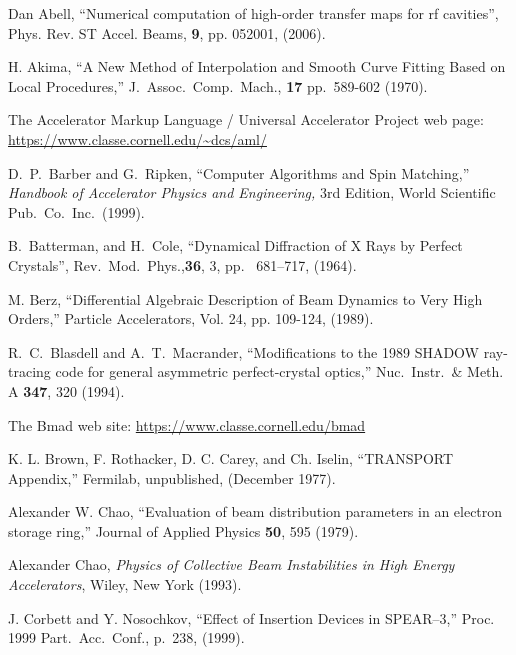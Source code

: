 \begin{thebibliography}{XXXXXXX99}

Dan Abell, ``Numerical computation of high-order transfer maps for rf cavities'',
Phys. Rev. ST Accel. Beams, {\bf 9}, pp. 052001, (2006).

H. Akima, ``A New Method of Interpolation and Smooth Curve Fitting Based on
Local Procedures,'' J.\ Assoc.\ Comp.\ Mach., {\bf 17} pp.~589-602 (1970).

The Accelerator Markup Language / Universal Accelerator Project web page:
\hfill\break
\hspace*{0.3in}
\url{https://www.classe.cornell.edu/~dcs/aml/}

D.~P.~Barber and G.~Ripken,
``Computer Algorithms and Spin Matching,''
{\it Handbook of Accelerator Physics and Engineering,}
3rd Edition, World Scientific Pub.\ Co.\ Inc.\ (1999).

B.~Batterman, and H.~Cole,
``Dynamical Diffraction of X Rays by Perfect Crystals'',
Rev.\ Mod.\ Phys.,{\bf 36}, 3, pp.~ 681--717, (1964).

M. Berz, 
``Differential Algebraic Description of Beam Dynamics to Very High Orders,''
Particle Accelerators, Vol. 24, pp. 109-124, (1989).

R.~C.~Blasdell and A.~T.~Macrander, ``Modifications to the 1989 SHADOW
 ray-tracing code for general asymmetric perfect-crystal optics,''
Nuc.\ Instr.\ \& Meth. A {\bf 347}, 320 (1994).

The Bmad web site:
\hfill\break
\hspace*{0.3in} \url{https://www.classe.cornell.edu/bmad}

K. L. Brown, F. Rothacker, D. C. Carey, and Ch. Iselin, ``TRANSPORT
Appendix,'' Fermilab, unpublished, (December 1977).

Alexander W. Chao, ``Evaluation of beam distribution parameters in an electron storage ring,''
Journal of Applied Physics {\bf 50}, 595 (1979).

Alexander Chao, {\em Physics of Collective Beam
Instabilities in High Energy Accelerators}, Wiley, New York (1993). 

J. Corbett and Y. Nosochkov, ``Effect of Insertion Devices in SPEAR--3,''
Proc. 1999 Part.\ Acc.\ Conf., p.~238, (1999).


\end{thebibliography}

